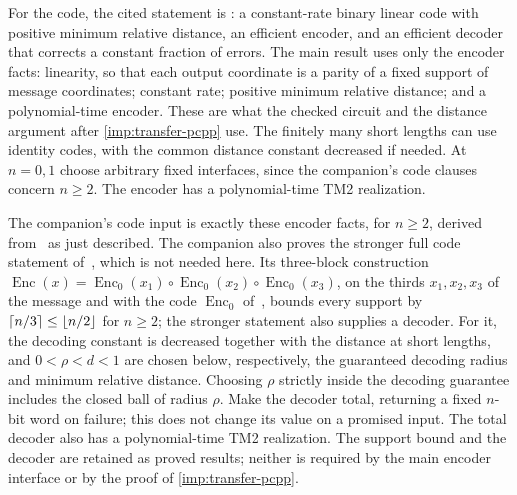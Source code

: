 For the code, the cited statement is \cite[Lemma~26]{CW19}: a
constant-rate binary linear code with positive minimum relative
distance, an efficient encoder, and an efficient decoder that corrects
a constant fraction of errors. The main result uses only the encoder
facts: linearity, so that each output coordinate is a parity of a
fixed support of message coordinates; constant rate; positive minimum
relative distance; and a polynomial-time encoder. These are what the
checked circuit and the distance argument after \cref{imp:transfer-pcpp}
use. The finitely many short lengths can use identity codes, with the
common distance constant decreased if needed. At \(n=0,1\) choose
arbitrary fixed interfaces, since the companion's code clauses
concern \(n\ge2\). The encoder has a polynomial-time TM2 realization.

The companion's code input is exactly these encoder facts, for
\(n\ge2\), derived from~\cite[Lemma~26]{CW19} as just described. The
companion also proves the stronger full code statement
of~\cite[Lemma~27]{CW19}, which is not needed here. Its three-block
construction
\(\operatorname{Enc}(x)=\operatorname{Enc}_0(x_1)\circ
\operatorname{Enc}_0(x_2)\circ\operatorname{Enc}_0(x_3)\), on the
thirds \(x_1,x_2,x_3\) of the message and with the code
\(\operatorname{Enc}_0\) of~\cite[Lemma~26]{CW19}, bounds every support
by \(\left\lceil n/3\right\rceil\le\left\lfloor n/2\right\rfloor\) for \(n\ge2\); the stronger statement
also supplies a decoder. For it, the decoding constant is decreased together with the
distance at short lengths, and \(0<\rho<d<1\) are chosen below,
respectively, the guaranteed decoding radius and minimum relative
distance. Choosing \(\rho\) strictly inside the decoding guarantee
includes the closed ball of radius \(\rho\). Make the decoder total,
returning a fixed \(n\)-bit word on failure; this does not change its
value on a promised input. The total decoder also has a
polynomial-time TM2 realization. The support bound and the decoder are
retained as proved results; neither is required by the main encoder
interface or by the proof of \cref{imp:transfer-pcpp}.

